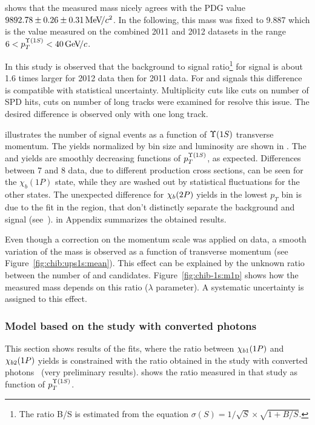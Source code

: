 shows that the measured \chiboneOneP mass
nicely agrees with the PDG value $9892.78 \pm 0.26 \pm 0.31 {\mathrm{\,Me\kern -0.1em V\!/}c^2}$. In
the following, this mass was fixed to 9.887 \gevcc which is the value 
measured on the combined 2011 and 2012 datasets in the range $6<p_T^{\Y1S}<40\gevc$.

In this study is observed that the background to signal ratio\footnote{ The
ratio B/S is estimated  from the equation $\sigma(S) = 1/\sqrt{S} \times
\sqrt{1 + B/S}$. } for \chibThreeP signal  is about 1.6 times
larger for 2012 data then for 2011 data. For \chibOneP and \chibTwoP signals
this difference is compatible with statistical uncertainty. Multiplicity cuts
like cuts on number of SPD hits, cuts on number of long tracks were examined for resolve
this issue. The desired difference is observed only with one long track.



 illustrates the number of signal events as
a function of $\Y1S$ transverse momentum. The yields
normalized by bin size and luminosity are shown in
. The \chibOneP and \chibThreeP yields
are smoothly decreasing functions of $p_T^{\Y1S}$, as expected. Differences between 7 and 8\tev
data, due to different production cross sections, can be seen for the
$\chi_b(1P)$ state, while they are washed out by statistical fluctuations for
the other states. The unexpected difference for $\chi_{b}(2P)$ yields in the lowest
$p_T$ bin is due to the fit in the region, that don't distinctly separate the background and signal (see~).
 in Appendix summarizes the
obtained results.



Even though a correction on the momentum scale was applied on data, a smooth variation of the
\chiboneOneP mass is observed as a function of transverse momentum (see
Figure~\ref{fig:chib:ups1s:mean}). This effect can be explained by the unknown
ratio between the number of \chiboneOneP and \chiboneTwoP candidates.
Figure~\ref{fig:chib-1s:m1p} shows how the measured mass depends on this ratio
($\lambda$ parameter). A systematic uncertainty is assigned to this effect.




\subsubsection{Model based on the study with converted photons}
This section shows results of the fits, where the ratio between
$\chi_{b 1}(1P)$ and $\chi_{b 2}(1P)$ yields is constrained with the ratio obtained
in the study with converted photons~\cite{Lespinasse:1664279} (very preliminary
results).  shows the ratio measured in that study as function
of $p_T^{\Y1S}$.

